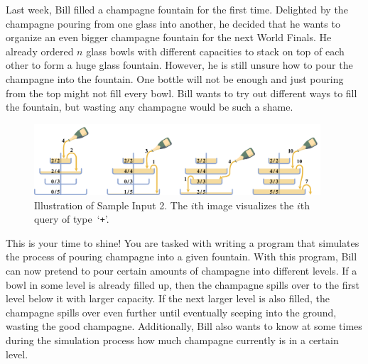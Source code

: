 \problemname{}


Last week, Bill filled a champagne fountain for the first time.
Delighted by the champagne pouring from one glass into another, he decided that he wants to organize an even bigger champagne fountain for the next World Finals.
He already ordered $n$ glass bowls with different capacities to stack on top of each other to form a huge glass fountain.
However, he is still unsure how to pour the champagne into the fountain.
One bottle will not be enough and just pouring from the top might not fill every bowl.
Bill wants to try out different ways to fill the fountain, but wasting any champagne would be such a shame.

\begin{figure}[!h]
	\centering
	\includegraphics[width=0.95\textwidth]{sample.pdf}
	\caption{Illustration of Sample Input 2.
		The $i$th image visualizes the $i$th query of type~`\texttt{+}'.}
\end{figure}

This is your time to shine!
You are tasked with writing a program that simulates the process of pouring champagne into a given fountain.
With this program, Bill can now pretend to pour certain amounts of champagne into different levels.
If a bowl in some level is already filled up, then the champagne spills over to
the first level below it with larger capacity.
If the next larger level is also filled, the champagne spills over even further until eventually seeping into the ground, wasting the good champagne.
Additionally, Bill also wants to know at some times during the simulation process how much champagne currently is in a certain level.

